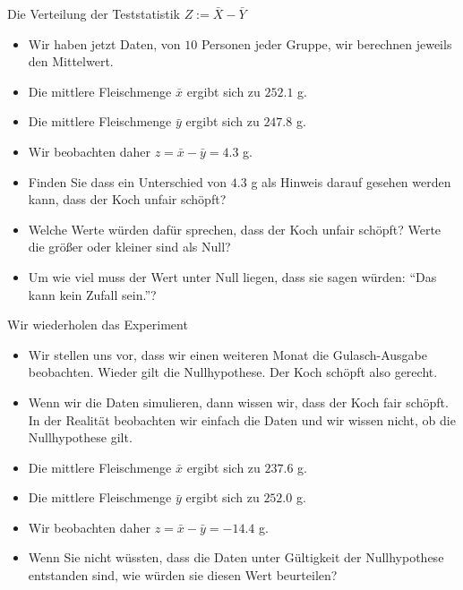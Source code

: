 \documentclass[usenames,dvipsnames,handout]{beamer}
\begin{document}
\begin{frame}{Die Verteilung der Teststatistik $Z:=\bar{X}-\bar{Y}$}

\begin{itemize}
\item{Wir haben jetzt Daten, von $10$ Personen jeder Gruppe, wir berechnen jeweils den Mittelwert.}\pause
\item{Die mittlere Fleischmenge $\bar{x}$ ergibt sich zu $252.1$ g.}\pause
\item{Die mittlere Fleischmenge $\bar{y}$ ergibt sich zu $247.8$ g.}\pause
\item{Wir beobachten daher $z=\bar{x}-\bar{y}=4.3$ g.}\pause
\item{Finden Sie dass ein Unterschied von $4.3$ g als Hinweis darauf gesehen werden kann, dass der Koch unfair schöpft?}\pause
\item{Welche Werte würden dafür sprechen, dass der Koch unfair schöpft? Werte die größer oder kleiner sind als Null?}\pause
\item{Um wie viel muss der Wert unter Null liegen, dass sie sagen würden: ``Das kann kein Zufall sein.''?}
\end{itemize}
\end{frame}
\begin{frame}{Wir wiederholen das Experiment}
\begin{itemize}
\item{Wir stellen uns vor, dass wir einen weiteren Monat die Gulasch-Ausgabe beobachten. Wieder gilt die Nullhypothese. Der Koch schöpft
also gerecht.}\pause
\item{Wenn wir die Daten simulieren, dann wissen wir, dass der Koch fair schöpft. In der Realität beobachten wir einfach die 
Daten und wir wissen nicht, ob die Nullhypothese gilt.}\pause
\item{Die mittlere Fleischmenge $\bar{x}$ ergibt sich zu $237.6$ g.}\pause
\item{Die mittlere Fleischmenge $\bar{y}$ ergibt sich zu $252.0$ g.}\pause
\item{Wir beobachten daher $z=\bar{x}-\bar{y}=-14.4$ g.}\pause
\item{Wenn Sie nicht wüssten, dass die Daten unter Gültigkeit der Nullhypothese entstanden sind, wie würden sie diesen Wert beurteilen?}
\end{itemize}
\end{frame}
\end{document}
